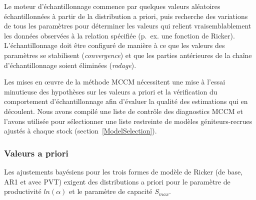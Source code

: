 \documentclass[french,11pt]{book}
\begin{document}
Le moteur d'échantillonnage commence par quelques valeurs aléatoires échantillonnées à partir de la distribution a priori, puis recherche des variations de tous les paramètres pour déterminer les valeurs qui relient vraisemblablement les données observées à la relation spécifiée (p.~ex. une fonction de Ricker). L'échantillonnage doit être configuré de manière à ce que les valeurs des paramètres se stabilisent (\emph{convergence}) et que les parties antérieures de la chaîne d'échantillonnage soient éliminées (\emph{rodage}).

Les mises en œuvre de la méthode MCCM nécessitent une mise à l'essai minutieuse des hypothèses sur les valeurs a priori et la vérification du comportement d'échantillonnage afin d'évaluer la qualité des estimations qui en découlent. Nous avons compilé une liste de contrôle des diagnostics MCCM et l'avons utilisée pour sélectionner une liste restreinte de modèles géniteurs-recrues ajustés à chaque stock (section~\ref{ModelSelection}).

\subsubsection{Valeurs a priori}\label{Priors}

Les ajustements bayésiens pour les trois formes de modèle de Ricker (de base, AR1 et avec PVT) exigent des distributions a priori pour le paramètre de productivité \(ln(\alpha)\) et le paramètre de capacité \(S_{max}\).
\end{document}
